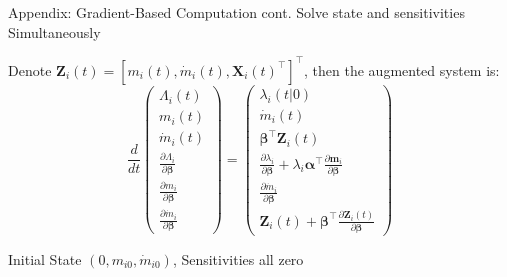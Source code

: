 \documentclass[aspectratio=169,12pt]{beamer}
\begin{document}
\begin{frame}{Appendix: Gradient-Based Computation cont.}
   Solve state and sensitivities Simultaneously
  \vspace{0.3cm}

  Denote $\mathbf{Z}_i(t) = [m_i(t), \dot{m}_i(t), \mathbf{X}_i(t)^{\top}]^{\top}$, then the augmented system is:
  $$\frac{d}{dt}\begin{pmatrix}
      \Lambda_i(t)                                            \\
      m_i(t)                                                  \\
      \dot{m}_i(t)                                            \\
      \frac{\partial \Lambda_i}{\partial \boldsymbol{\beta}} \\
      \frac{\partial m_i}{\partial \boldsymbol{\beta}}       \\
      \frac{\partial \dot{m}_i}{\partial \boldsymbol{\beta}}
    \end{pmatrix} = \begin{pmatrix}
      \lambda_i(t|0)                                                                                                                                            \\
      \dot{m}_i(t)                                                                                                                                              \\
      \boldsymbol{\beta}^{\top}\mathbf{Z}_i(t)                                                                                                                  \\
      \frac{\partial \lambda_i}{\partial \boldsymbol{\beta}} + \lambda_i \boldsymbol{\alpha}^{\top} \frac{\partial \mathbf{m}_i}{\partial \boldsymbol{\beta}} \\
      \frac{\partial \dot{m}_i}{\partial \boldsymbol{\beta}}                                                                                                   \\
      \mathbf{Z}_i(t) + \boldsymbol{\beta}^{\top}\frac{\partial \mathbf{Z}_i(t)}{\partial \boldsymbol{\beta}}
    \end{pmatrix}$$

  Initial State $(0, m_{i0}, \dot{m}_{i0})$, Sensitivities all zero
\end{frame}
\end{document}
